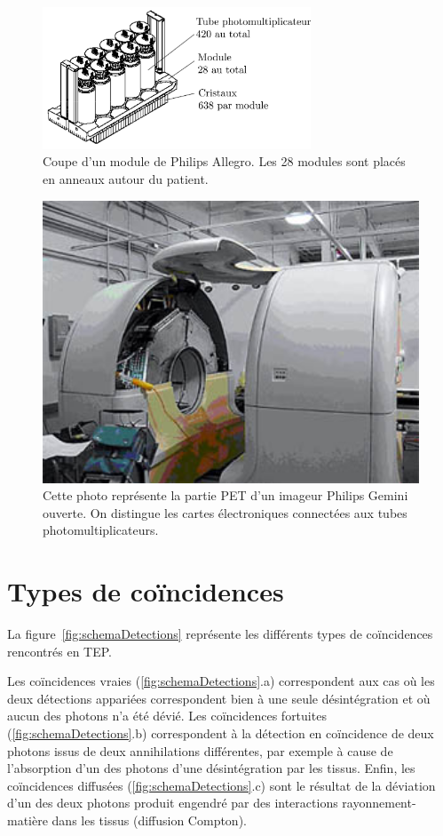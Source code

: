 \begin{figure}
\centering
\includegraphics[width=8cm]{images/coupe_module}
\caption[Coupe d'un module de Philips Allegro]{Coupe d'un module de Philips Allegro. Les 28 modules sont placés en anneaux autour du patient.}
\label{fig:moduleTEP}
\end{figure}


\begin{figure}
\centering
\includegraphics[width=12cm]{images/gemini_eclate}
\caption[Photo d'un imageur Philips Gemini ouvert]{Cette photo représente la partie PET d'un imageur Philips Gemini ouverte. On distingue les cartes électroniques connectées aux tubes photomultiplicateurs.}
\label{fig:gemini_ecl}
\end{figure}

	\section{Types de coïncidences}

La figure~\ref{fig:schemaDetections} représente les différents types de coïncidences rencontrés en TEP.

Les coïncidences vraies (\ref{fig:schemaDetections}.a) correspondent aux cas où les deux détections appariées correspondent bien à une seule désintégration et où aucun des photons n'a été dévié. Les coïncidences fortuites (\ref{fig:schemaDetections}.b) correspondent à la détection en coïncidence de deux photons issus de deux annihilations différentes, par exemple à cause de l’absorption d’un des photons d’une désintégration par les tissus. Enfin, les coïncidences diffusées (\ref{fig:schemaDetections}.c) sont le résultat de la déviation d'un des deux photons produit engendré par des interactions rayonnement-matière dans les tissus (diffusion Compton). 

